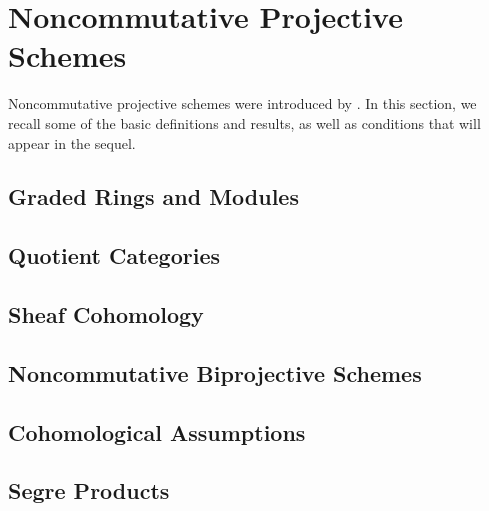 \chapter{Noncommutative Projective Schemes}\label{chapter: background on NCP}

Noncommutative projective schemes were introduced by \textcite{AZ94}.
In this section, we recall some of the basic definitions and results, as well as conditions that will appear in the sequel.

\section{Graded Rings and Modules}


\section{Quotient Categories}


\section{Sheaf Cohomology}


\section{Noncommutative Biprojective Schemes}


\section{Cohomological Assumptions}


\section{Segre Products}




